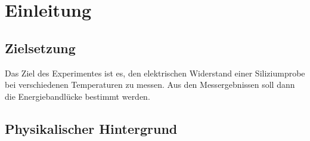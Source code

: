 \documentclass[a4paper,parskip,11pt, DIV12]{scrreprt}
\begin{document}

\tableofcontents

\chapter{Einleitung}

\section{Zielsetzung}

Das Ziel des Experimentes ist es, den elektrischen Widerstand einer Siliziumprobe bei verschiedenen Temperaturen zu messen. Aus den Messergebnissen soll dann die Energiebandlücke bestimmt werden.

\section{Physikalischer Hintergrund}
\label{ch:Physik}
\end{document}
